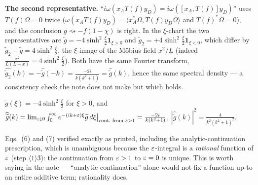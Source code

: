 \documentclass[11pt]{article}
\begin{document}
\begin{verdictok}
\textbf{The second representative.}  ``$i\omega(x_AT(f)y_D)=i\omega([x_A,T(f)]y_D)$'' uses $T(f)\Omega=0$ twice
($\omega(x_AT(f)y_D)=\langle x_A^*\Omega,T(f)y_D\Omega\rangle$ and $T(f)^*\Omega=0$), and the conclusion
$g\rightsquigarrow-f(1-\chi)$ is right.  In the $\xi$-chart the two representatives are
$\widetilde g=-4\sinh^2\frac\xi2\mathbf 1_{\xi>0}$ and $\widetilde g_2=+4\sinh^2\frac\xi2\mathbf 1_{\xi<0}$, which
differ by $\widetilde g_2-\widetilde g=4\sinh^2\frac\xi2$, the $\xi$-image of the M\"obius field $x^2/L$
(indeed $\frac{x^2}{L(L-x)}=4\sinh^2\frac\xi2$).  Both have the same Fourier transform,
$\widehat{\widetilde g_2}(k)=-\widehat{\widetilde g}(-k)=\frac{-2i}{k(k^2+1)}=\widehat{\widetilde g}(k)$,
hence the same spectral density --- a consistency check the note does not make but which holds.
\end{verdictok}
\begin{lemma}[N7 eq.~(6),(7)]\label{lem:gt}
$\widetilde g(\xi)=-4\sinh^2\frac\xi2$ for $\xi>0$, and
$\widehat{\widetilde g}(k)=\lim_{\varepsilon\downarrow0}\int_0^\infty e^{-(ik+\varepsilon)\xi}\widetilde g\,d\xi\bigr|_{\text{cont.\ from }\varepsilon>1}
=\frac{-2i}{k(k^2+1)}$, $|\widehat{\widetilde g}(k)|^2=\frac4{k^2(k^2+1)^2}$.
\end{lemma}
\begin{verdictok}
Eqs.~(6) and (7) verified exactly as printed, including the analytic-continuation prescription, which is
unambiguous because the $\varepsilon$-integral is a \emph{rational} function of $\varepsilon$ (step $\langle1\rangle3$): the
continuation from $\varepsilon>1$ to $\varepsilon=0$ is unique.  This is worth saying in the note --- ``analytic continuation''
alone would not fix a function up to an entire additive term; rationality does.
\end{verdictok}
\end{document}
